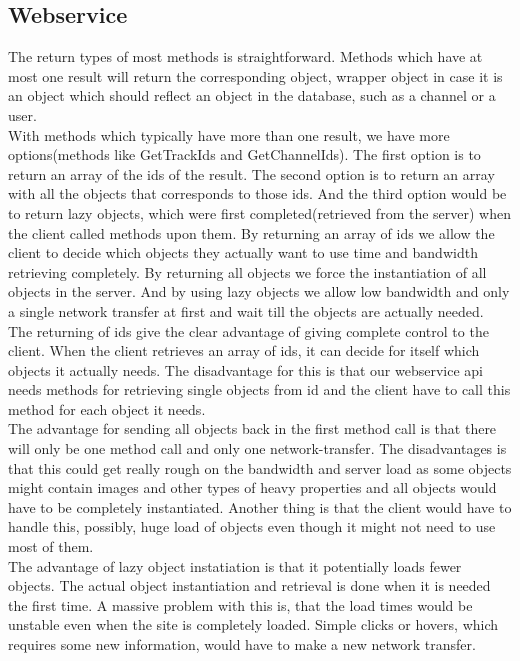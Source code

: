 \documentclass[a4paper,11pt,report]{article}
\begin{document}
\subsection{Webservice}
The return types of most methods is straightforward. Methods which have at most one result will return the corresponding object, wrapper object in case it is an object which should reflect an object in the database, such as a channel or a user. \\
With methods which typically have more than one result, we have more options(methods like GetTrackIds and GetChannelIds). 
The first option is to return an array of the ids of the result. The second option is to return an array with all the objects that corresponds to those ids. And the third option would be to return lazy objects, which were first completed(retrieved from the server) when the client called methods upon them. By returning an array of ids we allow the client to decide which objects they actually want to use time and bandwidth retrieving completely. By returning all objects we force the instantiation of all objects in the server. And by using lazy objects we allow low bandwidth and only a single network transfer at first and wait till the objects are actually needed.
The returning of ids give the clear advantage of giving complete control to the client. When the client retrieves an array of ids, it can decide for itself which objects it actually needs. The disadvantage for this is that our webservice api needs methods for retrieving single objects from id and the client have to call this method for each object it needs. \\
The advantage for sending all objects back in the first method call is that there will only be one method call and only one network-transfer. The disadvantages is that this could get really rough on the bandwidth and server load as some objects might contain images and other types of heavy properties and all objects would have to be completely instantiated. Another thing is that the client would have to handle this, possibly, huge load of objects even though it might not need to use most of them. \\
The advantage of lazy object instatiation is that it potentially loads fewer objects. The actual object instantiation and retrieval is done when it is needed the first time. A massive problem with this is, that the load times would be unstable even when the site is completely loaded. Simple clicks or hovers, which requires some new information, would have to make a new network transfer.
\end{document}
